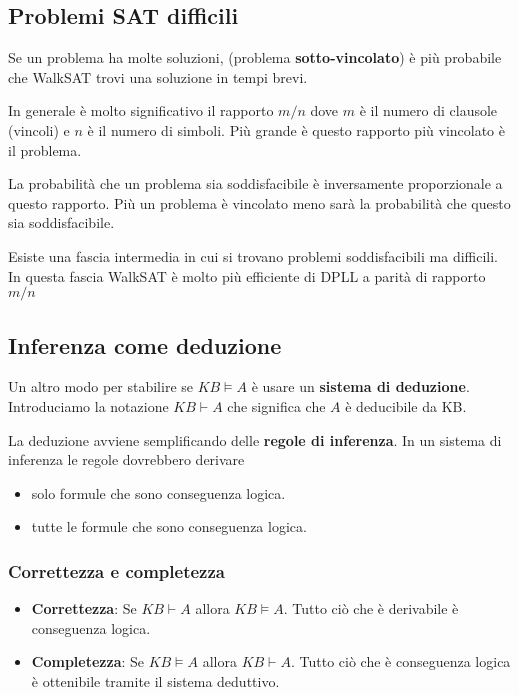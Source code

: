 \subsection{Problemi SAT difficili}
Se un problema ha molte soluzioni, (problema \textbf{sotto-vincolato}) \`e pi\`u probabile che WalkSAT trovi una
soluzione in tempi brevi.

In generale \`e molto significativo il rapporto $m / n$ dove $m$ \`e il numero di clausole (vincoli) e $n$ \`e il
numero di simboli. Pi\`u grande \`e questo rapporto pi\`u vincolato \`e il problema.

La probabilit\`a che un problema sia soddisfacibile \`e inversamente proporzionale a questo rapporto. Pi\`u un
problema \`e vincolato meno sar\`a la probabilit\`a che questo sia soddisfacibile.

Esiste una fascia intermedia in cui si trovano problemi soddisfacibili ma difficili. In questa fascia WalkSAT \`e molto
pi\`u efficiente di DPLL a parit\`a di rapporto $m/n$

\subsection{Inferenza come deduzione}
Un altro modo per stabilire se $KB \models A$ \`e usare un \textbf{sistema di deduzione}.
Introduciamo la notazione $KB \vdash A$ che significa che $A$ \`e deducibile da KB.

La deduzione avviene semplificando delle \textbf{regole di inferenza}.
In un sistema di inferenza le regole dovrebbero derivare
\begin{itemize}
	\item solo formule che sono conseguenza logica.
	\item tutte le formule che sono conseguenza logica.
\end{itemize}

\subsubsection{Correttezza e completezza}
\begin{itemize}
	\item \textbf{Correttezza}: Se $KB \vdash A$ allora $KB \models A$. Tutto ci\`o che \`e derivabile \`e conseguenza logica.
	\item \textbf{Completezza}: Se $KB \models A$ allora $KB \vdash A$. Tutto ci\`o che \`e conseguenza logica \`e ottenibile
	      tramite il sistema deduttivo.
\end{itemize}

